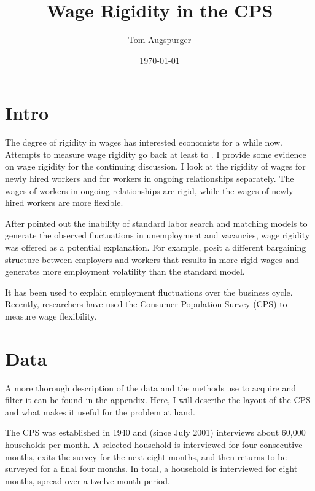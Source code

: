 \documentclass[11pt]{article}
\title{Wage Rigidity in the CPS}
\author{Tom Augspurger}
\date{\today}
\begin{document}
\maketitle


\section{Intro}
\label{sec:intro}

The degree of rigidity in wages has interested economists for a while now.
Attempts to measure wage rigidity go back at least to \cite{dunlop_1938}.
I provide some evidence on wage rigidity for the continuing discussion.
I look at the rigidity of wages for newly hired workers and for workers in ongoing relationships separately.
The wages of workers in ongoing relationships are rigid, while the wages of newly hired workers are more flexible.

After \cite{shimer_2005} pointed out the inability of standard labor search and matching models to generate the observed fluctuations in unemployment and vacancies, wage rigidity was offered as a potential explanation.
For example, \cite{hall_milgrom_2008} posit a different bargaining structure between employers and workers that results in more rigid wages and generates more employment volatility than the standard model.

It has been used to explain employment fluctuations over the business cycle.
Recently, researchers have used the Consumer Population Survey (CPS) to measure wage flexibility.


\section{Data}
\label{sec:data}

A more thorough description of the data and the methods use to acquire and filter it can be found in the appendix.
Here, I will describe the layout of the CPS and what makes it useful for the problem at hand.

The CPS was established in 1940 and (since July 2001) interviews about 60,000 households per month.
A selected household is interviewed for four consecutive months, exits the survey for the next eight months, and then returns to be surveyed for a final four months.
In total, a household is interviewed for eight months, spread over a twelve month period.
\end{document}

